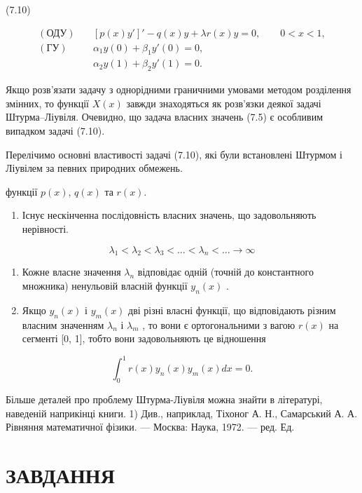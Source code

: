 \documentclass[
  ukrainian,
]{article}
\providecommand{\tightlist}{%
  \setlength{\itemsep}{0pt}\setlength{\parskip}{0pt}}
\begin{document}
(7.10)

\[
\begin{aligned}
(\text{ОДУ})\quad & [p(x)y']' - q(x)y + \lambda r(x)y = 0,\qquad 0<x<1,\\
(\text{ГУ})\quad & \alpha_1 y(0) + \beta_1 y'(0)=0,\\
& \alpha_2 y(1) + \beta_2 y'(1)=0.
\end{aligned}
\]

Якщо розв'язати задачу з однорідними граничними умовами методом
розділення змінних, то функції \(X(x)\) завжди знаходяться як розв'язки
деякої задачі Штурма--Ліувіля. Очевидно, що задача власних значень (7.5)
є особливим випадком задачі (7.10).

Перелічимо основні властивості задачі (7.10), які були встановлені
Штурмом і Ліувілем за певних природних обмежень.

функції \(p(x)\), \(q(x)\) та \(r(x)\).

\begin{enumerate}
\def\labelenumi{\arabic{enumi}.}
\tightlist
\item
  Існує нескінченна послідовність власних значень, що задовольняють
  нерівності.
\end{enumerate}

\[
\lambda_1 < \lambda_2 < \lambda_3 < \ldots < \lambda_n < \ldots \to \infty
\]

\begin{enumerate}
\def\labelenumi{\arabic{enumi}.}
\setcounter{enumi}{1}
\tightlist
\item
  Кожне власне значення \(\lambda_n\) відповідає одній (точній до
  константного множника) ненульовій власній функції \(y_n(x)\) .
\item
  Якщо \(y_n(x)\) і \(y_m(x)\) дві різні власні функції, що відповідають
  різним власним значенням \(\lambda_n\) і \(\lambda_m\) , то вони є
  ортогональними з вагою \(r(x)\) на сегменті {[}0, 1{]}, тобто вони
  задовольняють це відношення
\end{enumerate}

\[
\int_{0}^{1} r(x) y_{n}(x) y_{m}(x) dx = 0.
\]

Більше деталей про проблему Штурма-Ліувіля можна знайти в літературі,
наведеній наприкінці книги. 1) Див., наприклад, Тіхоног А. Н.,
Самарський А. А. Рівняння математичної фізики. --- Москва: Наука, 1972.
--- ред. Ед.

\section{ЗАВДАННЯ}\label{ux437ux430ux432ux434ux430ux43dux43dux44f-6}
\end{document}
